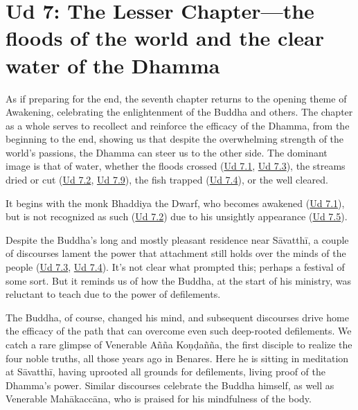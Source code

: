 \documentclass[12pt,openany]{book}%
\begin{document}
\section*{Ud 7: The Lesser Chapter—the floods of the world and the clear water of the Dhamma}

As if preparing for the end, the seventh chapter returns to the opening theme of Awakening, celebrating the enlightenment of the Buddha and others. The chapter as a whole serves to recollect and reinforce the efficacy of the Dhamma, from the beginning to the end, showing us that despite the overwhelming strength of the world’s passions, the Dhamma can steer us to the other side. The dominant image is that of water, whether the floods crossed (\href{https://suttacentral.net/ud7.1/en/sujato}{Ud 7.1}, \href{https://suttacentral.net/ud7.3/en/sujato}{Ud 7.3}), the streams dried or cut (\href{https://suttacentral.net/ud7.2/en/sujato}{Ud 7.2}, \href{https://suttacentral.net/ud7.9/en/sujato}{Ud 7.9}), the fish trapped (\href{https://suttacentral.net/ud7.4/en/sujato}{Ud 7.4}), or the well cleared.

It begins with the monk Bhaddiya the Dwarf, who becomes awakened (\href{https://suttacentral.net/ud7.1/en/sujato}{Ud 7.1}), but is not recognized as such (\href{https://suttacentral.net/ud7.2/en/sujato}{Ud 7.2}) due to his unsightly appearance (\href{https://suttacentral.net/ud7.5/en/sujato}{Ud 7.5}). 

Despite the Buddha’s long and mostly pleasant residence near \textsanskrit{Sāvatthī}, a couple of discourses lament the power that attachment still holds over the minds of the people (\href{https://suttacentral.net/ud7.3/en/sujato}{Ud 7.3}, \href{https://suttacentral.net/ud7.4/en/sujato}{Ud 7.4}). It’s not clear what prompted this; perhaps a festival of some sort. But it reminds us of how the Buddha, at the start of his ministry, was reluctant to teach due to the power of defilements.

The Buddha, of course, changed his mind, and subsequent discourses drive home the efficacy of the path that can overcome even such deep-rooted defilements. We catch a rare glimpse of Venerable \textsanskrit{Añña} \textsanskrit{Koṇḍañña}, the first disciple to realize the four noble truths, all those years ago in Benares. Here he is sitting in meditation at \textsanskrit{Sāvatthī}, having uprooted all grounds for defilements, living proof of the Dhamma’s power. Similar discourses celebrate the Buddha himself, as well as Venerable \textsanskrit{Mahākaccāna}, who is praised for his mindfulness of the body.
\end{document}
